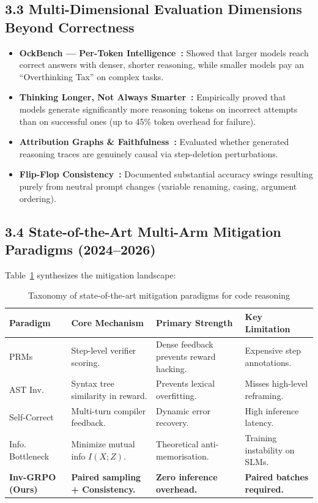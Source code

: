 \documentclass[12pt, a4paper]{article}
\begin{document}
\subsection{3.3 Multi-Dimensional Evaluation Dimensions Beyond Correctness}

\begin{itemize}[leftmargin=1.5em, itemsep=4pt]
  \item \textbf{OckBench --- Per-Token Intelligence~\cite{ockbench}:} Showed that larger models reach correct answers with denser, shorter reasoning, while smaller models pay an ``Overthinking Tax'' on complex tasks.
  \item \textbf{Thinking Longer, Not Always Smarter~\cite{thinking_longer}:} Empirically proved that models generate significantly more reasoning tokens on incorrect attempts than on successful ones (up to 45\% token overhead for failure).
  \item \textbf{Attribution Graphs \& Faithfulness~\cite{faithfulness_graphs}:} Evaluated whether generated reasoning traces are genuinely causal via step-deletion perturbations.
  \item \textbf{Flip-Flop Consistency~\cite{flip_flop_consistency}:} Documented substantial accuracy swings resulting purely from neutral prompt changes (variable renaming, casing, argument ordering).
\end{itemize}

\subsection{3.4 State-of-the-Art Multi-Arm Mitigation Paradigms (2024--2026)}

Table~\ref{tab:mitigation_landscape} synthesizes the mitigation landscape:

\begin{table}[ht!]
\centering
\caption{Taxonomy of state-of-the-art mitigation paradigms for code reasoning}
\label{tab:mitigation_landscape}
\renewcommand{\arraystretch}{1.3}
{\small
\begin{tabularx}{\textwidth}{l X X X}
\toprule
\textbf{Paradigm} & \textbf{Core Mechanism} & \textbf{Primary Strength} & \textbf{Key Limitation} \\
\midrule
PRMs~\cite{codeprm, execverify} & Step-level verifier scoring. & Dense feedback prevents reward hacking. & Expensive step annotations. \\
AST Inv.~\cite{treediff, veriseek} & Syntax tree similarity in reward. & Prevents lexical overfitting. & Misses high-level reframing. \\
Self-Correct~\cite{supercorrect} & Multi-turn compiler feedback. & Dynamic error recovery. & High inference latency. \\
Info. Bottleneck~\cite{ibft_memorization, ibro_rlvr} & Minimize mutual info $I(X;Z)$. & Theoretical anti-memorisation. & Training instability on SLMs. \\
\textbf{Inv-GRPO (Ours)} & \textbf{Paired sampling + Consistency.} & \textbf{Zero inference overhead.} & \textbf{Paired batches required.} \\
\bottomrule
\end{tabularx}
}
\end{table}
\end{document}
